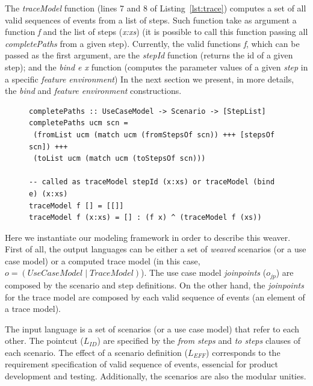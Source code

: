 
The \emph{traceModel} function (lines 7 and 8 of
Listing~\ref{lst:trace}) computes a set of all valid sequences of 
events from a list of steps. Such function take as argument a function
\emph{f} and the list of steps (\emph{x:xs}) (it is possible to call
this function passing  all \emph{completePaths} from a given step).
Currently, the valid functions \emph{f}, which can be passed as the
first argument, are the \emph{stepId} function (returns the id
of a given step); and the \emph{bind e x} function (computes the
parameter values of a given \emph{step} in a specific \emph{feature
environment}) In the next section we present, in more details, the \emph{bind} and \emph{feature
environment} constructions.

\begin{figure}
\begin{lstlisting}[belowskip=10pt,frame=tb,caption={The \emph{completePaths} and \emph{traceModel weaver} 
functions},label=lst:trace]
completePaths :: UseCaseModel -> Scenario -> [StepList]
completePaths ucm scn =
 (fromList ucm (match ucm (fromStepsOf scn)) +++ [stepsOf scn]) +++ 
 (toList ucm (match ucm (toStepsOf scn)))

-- called as traceModel stepId (x:xs) or traceModel (bind e) (x:xs)
traceModel f [] = [[]]
traceModel f (x:xs) = [] : (f x) ^ (traceModel f (xs))
\end{lstlisting}
\end{figure}

Here we instantiate our modeling framework in order to describe 
this weaver. First of all, the output languages can be either a set of \emph{weaved} scenarios (or
a use case model) or a computed trace model (in this case, $o =
(UseCaseModel \mid TraceModel)$). The use case model \emph{joinpoints} ($o_{jp}$)
are composed by the scenario and step definitions. On the other hand, the
\emph{joinpoints} for the trace model are composed by each valid
sequence of events (an element of a trace model).

The input language is a set of scenarios (or a use case model) that refer to
each other. The pointcut ($L_{ID}$) are specified by
the \emph{from steps} and \emph{to steps} clauses of each scenario. The effect 
of a scenario definition ($L_{EFF}$) corresponds
to the requirement specification of valid sequence of events, essencial
for product development and testing.  Additionally, the scenarios
are also the modular unities.

